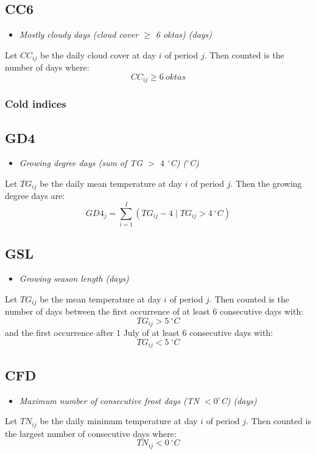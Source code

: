 \documentclass[a4paper,11pt]{article}
\begin{document}
\subsection*{CC6}
\begin{itemize}
\item \textit{Mostly cloudy days (cloud cover $\geq$ 6 oktas) (days)}
\end{itemize}
Let $CC_{ij}$ be the daily cloud cover at day $i$ of period
$j$. Then counted is the number of days where:
\begin{equation*}
CC_{ij} \geq 6 \:oktas
\end{equation*}


\subsubsection{Cold indices}

\subsection*{GD4}
\begin{itemize}
\item \textit{Growing degree days (sum of TG $>$ $4$ $^\circ$C)
($^\circ$C)}
\end{itemize}
Let $TG_{ij}$ be the daily mean temperature at day $i$ of period
$j$. Then the growing degree days are:
\begin{equation*}
GD4_{j} = \sum_{i=1}^{I}(TG_{ij}-4 \mid TG_{ij} > 4 \:^{\circ}C)
\end{equation*}

\subsection*{GSL}
\begin{itemize}
\item \textit{Growing season length (days)}
\end{itemize}
Let $TG_{ij}$ be the mean temperature at day $i$ of period $j$. Then
counted is the number of days between the first occurrence of at least 6
consecutive days with:
\begin{equation*}
TG_{ij} > 5 \:^\circ C
\end{equation*}
and the first occurrence after 1 July of at least 6 consecutive days
with: 
\begin{equation*}
TG_{ij} < 5 \:^\circ C
\end{equation*}


\subsection*{CFD}
\begin{itemize}
\item \textit{Maximum number of consecutive frost days (TN $< 0^\circ$C) (days)}
\end{itemize}
Let $TN_{ij}$ be the daily minimum temperature at day $i$ of period
$j$. Then counted is the largest number of consecutive days where:
\begin{equation*}
TN_{ij} < 0 \:^\circ C
\end{equation*}
\end{document}
